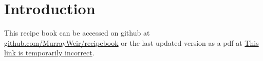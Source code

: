 \section{Introduction}

This recipe book can be accessed on github at \href{https://github.com/MurrayWeir/recipe_book}{github.com/MurrayWeir/recipe\textunderscore book}
or the last updated version as a pdf at \href{https://github.com/MurrayWeir/recipe_book}{This link is temporarily incorrect}.